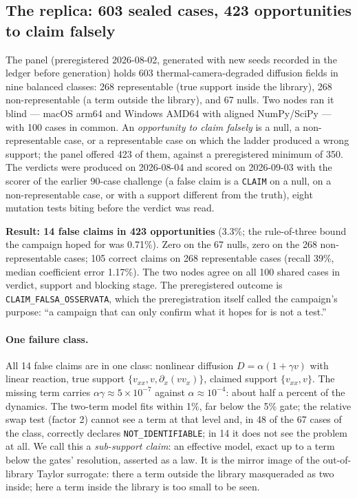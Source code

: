 \documentclass[11pt]{article}
\begin{document}
\subsection{The replica: 603 sealed cases, 423 opportunities to claim falsely}
The panel (preregistered 2026-08-02, generated with new seeds recorded in the
ledger before generation) holds 603 thermal-camera-degraded diffusion
fields in nine balanced classes: 268 representable
(true support inside the library), 268 non-representable
(a term outside the library), and 67 nulls. Two nodes ran it blind
--- macOS arm64 and Windows AMD64 with aligned NumPy/SciPy --- with 100 cases
in common. An \emph{opportunity to claim falsely} is a null, a
non-representable case, or a representable case on which the ladder produced a
wrong support; the panel offered 423 of them, against a
preregistered minimum of 350. The verdicts were produced on 2026-08-04 and
scored on 2026-09-03 with the scorer of the earlier 90-case challenge (a false
claim is a \texttt{CLAIM} on a null, on a non-representable case, or with a
support different from the truth), eight mutation tests biting before the
verdict was read.

\textbf{Result: 14 false claims in 423 opportunities}
(3.3\%; the rule-of-three bound the campaign hoped for was
0.71\%). Zero on the 67 nulls, zero on the
268 non-representable cases; 105 correct
claims on 268 representable cases (recall
39\%, median coefficient
error 1.17\%). The two nodes agree on all 100
shared cases in verdict, support and blocking stage. The preregistered outcome
is \texttt{CLAIM\_FALSA\_OSSERVATA}, which the preregistration itself called
the campaign's purpose: ``a campaign that can only confirm what it hopes for is
not a test.''

\paragraph{One failure class.} All 14 false claims are in
one class: nonlinear diffusion $D = \alpha(1 + \gamma v)$ with linear reaction,
true support $\{v_{xx}, v, \partial_x(v v_x)\}$, claimed support
$\{v_{xx}, v\}$. The missing term carries $\alpha\gamma \approx 5 \times
10^{-7}$ against $\alpha \approx 10^{-4}$: about half a percent of the
dynamics. The two-term model fits within 1\%, far below the 5\% gate; the
relative swap test (factor 2) cannot see a term at that level and, in 48 of the
67 cases of the class, correctly declares \texttt{NOT\_IDENTIFIABLE}; in
14 it does not see the problem at all. We call this a
\emph{sub-support claim}: an effective model, exact up to a term below the
gates' resolution, asserted as a law. It is the mirror image of the
out-of-library Taylor surrogate: there a term outside the library masqueraded
as two inside; here a term inside the library is too small to be seen.
\end{document}
